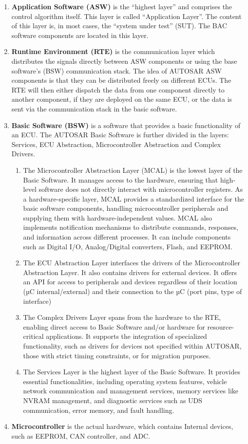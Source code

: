 \begin{enumerate}
\item \textbf{Application Software (ASW)} is the “highest layer” and comprises the control algorithm itself. This layer is called “Application Layer”. The content of this layer is, in most cases, the “system under test” (SUT). The BAC software components are located in this layer.
\item \textbf{Runtime Environment (RTE)} is the communication layer which distributes the signals directly between ASW components or using the base software’s (BSW) communication stack. The idea of AUTOSAR ASW components is that they can be distributed freely on different ECUs. The RTE will then either dispatch the data from one component directly to another component, if they are deployed on the same ECU, or the data is sent via the communication stack in the basic software.
\item \textbf{Basic Software (BSW)} is a software that provides a basic functionality of an ECU. The AUTOSAR Basic Software is further divided in the layers: Services, ECU Abstraction, Microcontroller Abstraction and Complex Drivers.
\begin{enumerate}
\item The Microcontroller Abstraction Layer (MCAL) is the lowest layer of the Basic Software. It manages access to the hardware, ensuring that high-level software does not directly interact with microcontroller registers. As a hardware-specific layer, MCAL provides a standardized interface for the basic software components, handling microcontroller peripherals and supplying them with hardware-independent values. MCAL also implements notification mechanisms to distribute commands, responses, and information across different processes. It can include components such as Digital I/O, Analog/Digital converters, Flash, and EEPROM.
\item The ECU Abstraction Layer interfaces the drivers of the Microcontroller Abstraction
Layer. It also contains drivers for external devices. It offers an API for access to peripherals and devices regardless of their location (µC internal/external) and their connection to the
µC (port pins, type of interface)
\item The Complex Drivers Layer spans from the hardware to the RTE, enabling direct access to Basic Software and/or hardware for resource-critical applications. It supports the integration of specialized functionality, such as drivers for devices not specified within AUTOSAR, those with strict timing constraints, or for migration purposes.
\item The Services Layer is the highest layer of the Basic Software. It provides essential functionalities, including operating system features, vehicle network communication and management services, memory services like NVRAM management, and diagnostic services such as UDS communication, error memory, and fault handling.
\end{enumerate}
\item \textbf{Microcontroller} is the actual hardware, which contains Internal devices, such as EEPROM, CAN controller, and ADC.
\end{enumerate}
